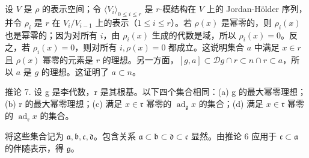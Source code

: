 设 \(V\) 是 \(\rho\) 的表示空间；令 \(\langle V_i \rangle_{0 \leqslant i \leqslant r}\) 是 \(r\)-模结构在 \(V\) 上的 Jordan-Hölder 序列，并令 \(\rho_i\) 是 \(r\) 在 \(V_i / V_{i-1}\) 上的表示（\(1 \leqslant i \leqslant r\)）。若 \(\rho(x)\) 是幂零的，则 \(\rho_i(x)\) 也是幂零的；因为对所有 \(i\)，由 \(\rho_i(x)\) 生成的代数是域，所以 \(\rho_i(x) = 0\)。反之，若 \(\rho_i(x) = 0\)，则对所有 \(i, \rho(x) = 0\) 都成立。这说明集合 \(a\) 中满足 \(x \in r\) 且 \(\rho(x)\) 幂零的元素是 \(r\) 的理想。另一方面，\([g, a] \subset \mathcal{D}g \cap r \subset n \cap r \subset a\)，所以 \(a\) 是 \(g\) 的理想。这证明了 \(a \subset n\)。

推论 7. 设 g 是李代数，r 是其根基。以下四个集合相同：(a) g 的最大幂零理想；(b) r 的最大幂零理想；(c) 满足 \(x \in \mathfrak{r}\) 幂零的 \(\operatorname{ad}_{\mathfrak{g}} x\) 的集合；(d) 满足 \(x \in \mathfrak{r}\) 幂零的 \(\operatorname{ad}_{\mathfrak{r}} x\) 的集合。

将这些集合记为 \(\mathfrak{a}, \mathfrak{b}, \mathfrak{c}, \mathfrak{d}\)。包含关系 \(\mathfrak{a} \subset \mathfrak{b} \subset \mathfrak{d} \subset \mathfrak{c}\) 显然。由推论 6 应用于 \(\mathfrak{c} \subset \mathfrak{a}\) 的伴随表示，得 \(\mathfrak{g}\)。

